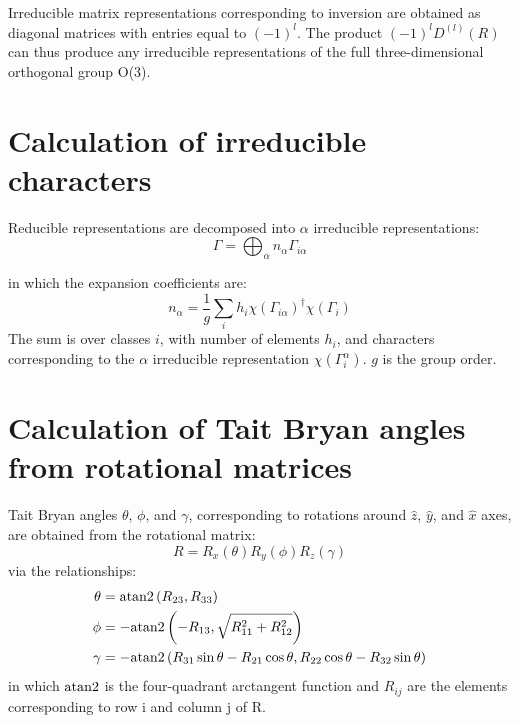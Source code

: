 \documentclass[preprint,showpacs,preprintnumbers,superscriptaddress,prb,floatfix,aps]{revtex4-1}
\begin{document}
Irreducible matrix representations corresponding to inversion are obtained as diagonal matrices with entries equal to $(-1)^l$. The product $(-1)^{l} D^{(l)}(R)$  can thus produce any irreducible representations of the full three-dimensional orthogonal group O(3).\cite{sharma_general_1979,el-batanouny_symmetry_2008} %



%
%
%
\section{Calculation of irreducible characters}
Reducible representations are decomposed into $\alpha$ irreducible representations:
\begin{equation}
\label{eq:irrep_decomposition}
\Gamma = \bigoplus_\alpha n_\alpha \Gamma_{i\alpha}
\end{equation}

in which the expansion coefficients are:
\begin{equation}
\label{eq:irrep_decomposition_coefficients}
n_\alpha = \frac{1}{g} \sum_i h_i \chi\left(\Gamma_{i\alpha}\right)^\dag \chi\left(\Gamma_i\right)
\end{equation}
The sum is over classes $i$, with number of elements $h_i$, and characters corresponding to the $\alpha$ irreducible representation $\chi(\Gamma_i^\alpha)$. $g$ is the group order.





\section{Calculation of Tait Bryan angles from rotational matrices}
Tait Bryan angles $\theta$, $\phi$, and $\gamma$, corresponding to rotations around $\hat{z}$, $\hat{y}$, and $\hat{x}$ axes, are obtained from the rotational matrix:
\begin{equation}
\label{eq:rotation}
R = R_x(\theta)R_y(\phi)R_z(\gamma)
\end{equation}
via the relationships:
\begin{align}
\label{eq:tait_bryan_angles}
\theta & = {\rm atan2}\left(R_{23},R_{33}\right) \\
\phi   & =-{\rm atan2}\left(-R_{13},\sqrt{R_{11}^2+R_{12}^2}\right) \\
\gamma & =-{\rm atan2}\left(R_{31}\sin{\theta}-R_{21}\cos{\theta},R_{22}\cos{\theta}-R_{32}\sin{\theta}\right)
\end{align}
in which ${\rm atan2}$ is the four-quadrant arctangent function and $R_{ij}$ are the elements corresponding to row i and column j of R. 
\end{document}
